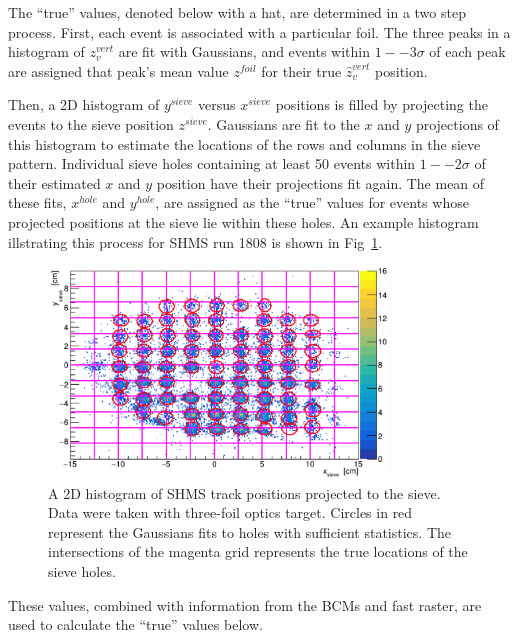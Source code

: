 The ``true'' values, denoted below with a hat, are determined in a two step
process.
First, each event is associated with a particular foil.
The three peaks in a histogram of $z^{vert}_v$ are fit with Gaussians, and
events within $1--3\sigma$ of each peak are assigned that peak's mean value
$z^{foil}$ for their true $\hat{z}^{vert}_v$ position.


Then, a 2D histogram of $y^{sieve}$ versus $x^{sieve}$ positions is filled by
projecting the events to the sieve position $z^{sieve}$.
Gaussians are fit to the $x$ and $y$ projections of this histogram to estimate
the locations of the rows and columns in the sieve pattern.
Individual sieve holes containing at least 50 events within $1--2\sigma$ of
their estimated $x$ and $y$ position have their projections fit again.
The mean of these fits, $x^{hole}$ and $y^{hole}$, are assigned as the ``true''
values for events whose projected positions at the sieve lie within these
holes.
An example histogram illstrating this process for SHMS run 1808 is shown in
Fig~\ref{fig:shms_xysieve}.

\begin{figure}[!h]
    \centering
    \includegraphics[width=0.8\textwidth]{chap4/shms_xysieve.png}
    \caption{
            A 2D histogram of SHMS track positions projected to the sieve.
            Data were taken with three-foil optics target.
            Circles in red represent the Gaussians fits to holes with
            sufficient statistics.
            The intersections of the magenta grid represents the true locations
            of the sieve holes.
            }
    \label{fig:shms_xysieve}
\end{figure}


These values, combined with information from the BCMs and fast raster, are used
to calculate the ``true'' values below.


